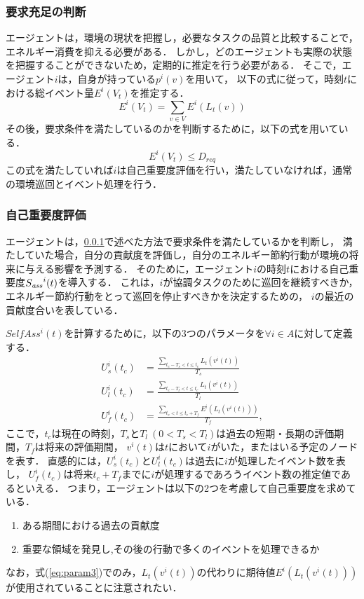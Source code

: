 \documentclass[12pt,a4j,twoside]{jarticle}
\def\AgentSet{A}
\def\SelfAss{{S_{\it ass}}}
\begin{document}
  \subsubsection{要求充足の判断}\label{subsec:judge}
  エージェントは，環境の現状を把握し，必要なタスクの品質と比較することで，エネルギー消費を抑える必要がある．
  しかし，どのエージェントも実際の状態を把握することができないため，定期的に推定を行う必要がある．
  そこで，エージェント$i$は，自身が持っている$p^i(v)$を用いて，
  以下の式に従って，時刻$t$における総イベント量$E^i(V_t)$を推定する．
  \begin{equation}\label{eq:fulfill}
    E^i(V_t) = \sum_{v \in V} E^i(L_t(v))
  \end{equation}
  その後，要求条件を満たしているのかを判断するために，以下の式を用いている．
  \begin{equation}\label{eq:requirement}
    E^i(V_t) \leq D_{req}
  \end{equation}
  この式を満たしていれば$i$は自己重要度評価を行い，満たしていなければ，通常の環境巡回とイベント処理を行う．

  \subsubsection{自己重要度評価}
  エージェントは，\ref{subsec:judge}で述べた方法で要求条件を満たしているかを判断し，
  満たしていた場合，自分の貢献度を評価し，自分のエネルギー節約行動が環境の将来に与える影響を予測する．
  そのために，エージェント$i$の時刻$t$における自己重要度$\SelfAss^i(t)$を導入する．
  これは，$i$が協調タスクのために巡回を継続すべきか，エネルギー節約行動をとって巡回を停止すべきかを決定するための，
  $i$の最近の貢献度合いを表している．
  \par

  $SelfAss^i(t)$を計算するために，以下の3つのパラメータを$\forall i\in\AgentSet$に対して定義する．
  \begin{align}\label{eq:param1}
    U^i_s(t_c) &= \frac{\sum_{t_c-T_s < t \leq t_c} L_t(v^i(t))}{T_s}\\
    U^i_l(t_c) &= \frac{\sum_{t_c-T_l < t \leq t_c} L_t(v^i(t))}{T_l}\label{eq:param2}\\
    U^i_f(t_c) &= \frac{\sum_{t_c < t \leq t_c+T_f} E^i(L_t(v^i(t)))}{T_f},\label{eq:param3}
  \end{align}
  ここで，$t_c$は現在の時刻，$T_s$と$T_l~(0 < T_s < T_l)$は過去の短期・長期の評価期間，$T_f$は将来の評価期間，
  $v^i(t)$は$t$において$i$がいた，またはいる予定のノードを表す．
  直感的には，$U^i_s(t_c)$と$U^i_l(t_c)$は過去に$i$が処理したイベント数を表し，
  $U^i_f(t_c)$は将来$t_c+T_f$までに$i$が処理するであろうイベント数の推定値であるといえる．
  つまり，エージェントは以下の2つを考慮して自己重要度を求めている．
  \begin{enumerate}
    \item[(1)] ある期間における過去の貢献度
    \item[(2)] 重要な領域を発見し,その後の行動で多くのイベントを処理できるか
  \end{enumerate}
  なお，式(\ref{eq:param3})でのみ，$L_t(v^i(t))$の代わりに期待値$E^i(L_t(v^i(t)))$が使用されていることに注意されたい．
  \par
\end{document}
